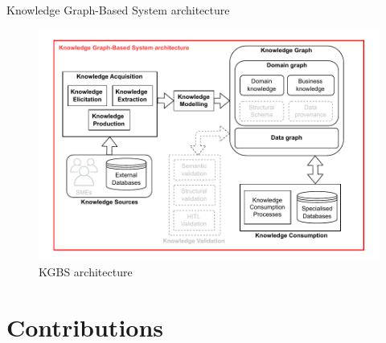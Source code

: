 \begin{frame}{Knowledge Graph-Based System architecture}

    \begin{figure} [H]
        \begin{center}
            \includegraphics[scale=0.5]{images/KGBS-architecture.pdf} 
            \caption{KGBS architecture} 
        \end{center}
    \end{figure}

\end{frame}




\section{Contributions}

